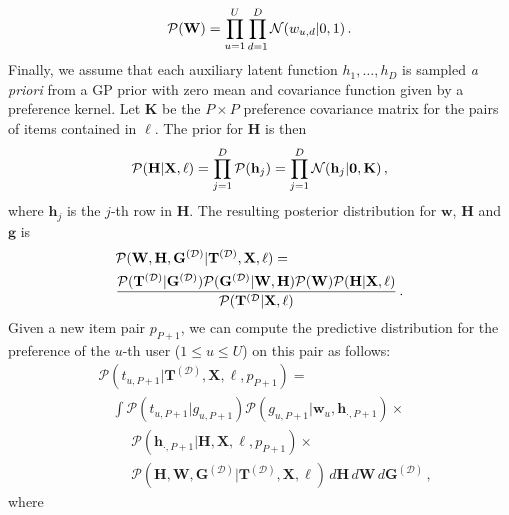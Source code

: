 \begin{equation}
\mathcal{P}(\mathbf{W})=\prod_{u=1}^{U}\prod_{d=1}^D \mathcal{N}(w_{u,d}|0,1)\,.\notag
\end{equation}
Finally, we assume that each auxiliary latent function $h_1,\ldots,h_D$ is sampled \textit{a priori} from a GP
prior with zero mean and covariance function given by a preference kernel. 
Let $\mathbf{K}$ be the $P \times P$ preference covariance 
matrix for the pairs of items contained in $\ell$. The prior for $\mathbf{H}$ is then 
\begin{equation}
\mathcal{P}(\mathbf{H}|\mathbf{X},\ell)=\prod_{j=1}^{D}\mathcal{P}(\mathbf{h}_{j})=
\prod_{j=1}^{D}\mathcal{N}(\mathbf{h}_j|\mathbf{0},\mathbf{K})\,,\notag
\end{equation}
where $\mathbf{h}_j$ is the $j$-th row in $\mathbf{H}$. The resulting posterior distribution for $\mathbf{w}$, $\mathbf{H}$ and $\mathbf{g}$ is
\begin{align}
&\mathcal{P}(\mathbf{W},\mathbf{H},\mathbf{G}^{(\mathcal{D})}|\mathbf{T}^{(\mathcal{D})},\mathbf{X},\ell) = \notag \\
&\frac{\mathcal{P}(\mathbf{T}^{(\mathcal{D})}|\mathbf{G}^{(\mathcal{D})})
\mathcal{P}(\mathbf{G}^{(\mathcal{D})}|\mathbf{W},\mathbf{H})\mathcal{P}(\mathbf{W})\mathcal{P}
(\mathbf{H}|\mathbf{X},\ell)}{\mathcal{P}(\mathbf{T}^{(\mathcal{D}}|\mathbf{X},\ell)}\,.\label{eq:post}
\end{align}
Given a new item pair $p_{P+1}$, we can compute the predictive distribution for the preference of the $u$-th user ($1 \leq u \leq U$) on this pair as follows:
\begin{align}
&\mathcal{P}(t_{u,P+1}|\mathbf{T}^{(\mathcal{D})},\mathbf{X},\ell,p_{P+1}) = \nonumber\\
&\quad\int \mathcal{P}(t_{u,P+1}|g_{u,P+1}) \mathcal{P}(g_{u,P+1}|\mathbf{w}_u,\mathbf{h}_{\cdot,P+1})\times \nonumber\\
&\qquad\,\,\mathcal{P}(\mathbf{h}_{\cdot,P+1}|\mathbf{H},\mathbf{X},\ell,p_{P+1})\times \nonumber\\
&\qquad\,\,\mathcal{P}(\mathbf{H},\mathbf{W},\mathbf{G}^{(\mathcal{D})}|\mathbf{T}^{(\mathcal{D})},\mathbf{X},\ell)\,d\mathbf{H}\,d\mathbf{W}\,d\mathbf{G}^{(\mathcal{D})}\,,
\label{eq:predictions}
\end{align}
where \DIFdelbegin {}\DIFdelend \DIFaddbegin {}\\
